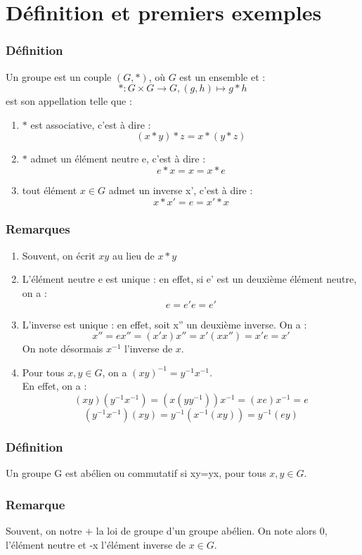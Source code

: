 \documentclass[a4paper, oneside]{report}
\newcommand{\x}{\times}
\begin{document}
\section{Définition et premiers exemples}

\subsubsection{Définition}
Un groupe est un couple $(G,*)$, où $G$ est un ensemble et :
$$*:G\x G \rightarrow G, (g,h)\mapsto g*h$$
est son appellation telle que :
\begin{enumerate}
\item $*$ est associative, c'est à dire :
$$(x*y)*z=x*(y*z)$$
\item $*$ admet un élément neutre e, c'est à dire :
$$e*x = x = x*e$$
\item tout élément $x\in G$ admet un inverse x', c'est à dire :
$$x*x'=e=x'*x$$
\end{enumerate}

\subsubsection{Remarques}
\begin{enumerate}
\item Souvent, on écrit $xy$ au lieu de $x*y$\\
\item L'élément neutre e est unique : en effet, si e' est un deuxième élément neutre, on a :
$$ e = e'e = e'$$
\item L'inverse est unique : en effet, soit x'' un deuxième inverse. On a :
$$x''=ex''=(x'x)x''=x'(xx'')=x'e=x'$$
On note désormais $x^{-1}$ l'inverse de $x$.\\
\item Pour tous $x,y\in G$, on a $(xy)^{-1}=y^{-1}x^{-1}$.\\
En effet, on a :
$$(xy)(y^{-1}x^{-1})=(x(yy^{-1}))x^{-1} = (xe)x^{-1}=e$$
$$(y^{-1}x^{-1})(xy)=y^{-1}(x^{-1}(xy))=y^{-1}(ey)$$
\end{enumerate}

\subsubsection{Définition}
Un groupe G est abélien ou commutatif si xy=yx, pour tous $x,y\in G$.

\subsubsection{Remarque}
Souvent, on notre $+$ la loi de groupe d'un groupe abélien. On note alors 0, l'élément neutre et -x l'élément inverse de $x\in G$.
\end{document}
